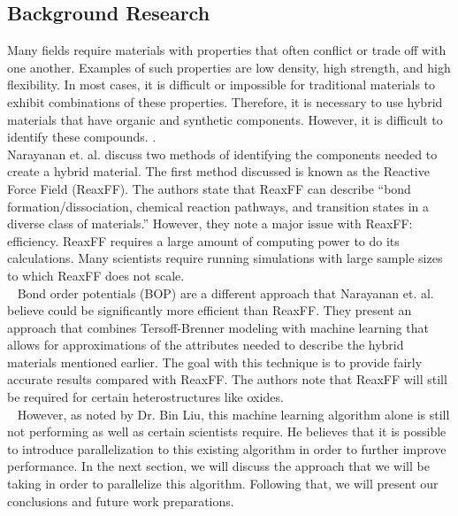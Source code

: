 \documentclass[letterpaper, 12pt]{article}
\begin{document}
\begin{flushleft}

\section*{Background Research}
Many fields require materials with properties that often conflict or trade off with one another.  Examples of such properties are low density, high strength, and high flexibility.  In most cases, it is difficult or impossible for traditional materials to exhibit combinations of these properties. Therefore, it is necessary to use hybrid materials that have organic and synthetic components. However, it is difficult to identify these compounds. \cite{C7NR06038F}.\\

Narayanan et. al. discuss two methods of identifying the components needed to create a hybrid material. The first
method discussed is known as the Reactive Force Field (ReaxFF). The authors state that ReaxFF can describe ``bond formation/dissociation, chemical reaction pathways, and transition states in a diverse class of materials.'' However, they note a major issue with ReaxFF: efficiency. ReaxFF requires a large amount of computing power to do its calculations. Many scientists require running simulations with large sample sizes to which ReaxFF does not scale. \\
~\newline
Bond order potentials (BOP) are a different approach that Narayanan et. al. believe could be significantly more
efficient than ReaxFF. They present an approach that combines Tersoff-Brenner modeling with machine learning that
allows for approximations of the attributes needed to describe the hybrid materials mentioned earlier. The goal
with this technique is to provide fairly accurate results compared with ReaxFF. The authors note that
ReaxFF will still be required for certain heterostructures like oxides. \\
~\newline
However, as noted by Dr. Bin Liu, this machine learning algorithm alone is still not performing as well as 
certain scientists require. He believes that it is possible to introduce parallelization to this existing
algorithm in order to further improve performance. In the next section, we will discuss the approach that we
will be taking in order to parallelize this algorithm.  Following that, we will present our conclusions and future work preparations.


\end{flushleft}
\end{document}
